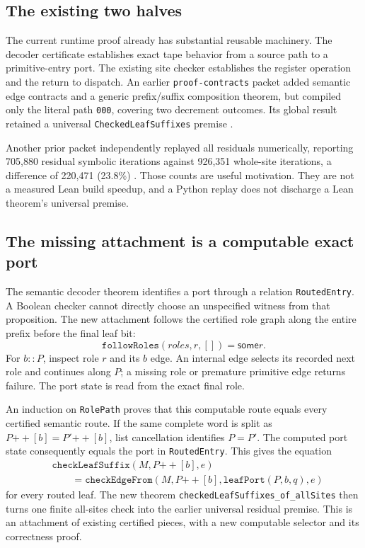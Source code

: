 \documentclass[11pt,letterpaper]{article}
\newcommand{\code}[1]{\texttt{#1}}
\newcommand{\Some}{\mathsf{some}}
\begin{document}
\subsection{The existing two halves}

The current runtime proof already has substantial reusable machinery. The decoder
certificate establishes exact tape behavior from a source path to a primitive-entry
port. The existing site checker establishes the register operation and the return to
dispatch. An earlier \code{proof-contracts} packet added semantic edge contracts and
a generic prefix/suffix composition theorem, but compiled only the literal path
\code{000}, covering two decrement outcomes. Its global result retained a universal
\code{CheckedLeafSuffixes} premise \cite{contracts}.

Another prior packet independently replayed all residuals numerically, reporting
705,880 residual symbolic iterations against 926,351 whole-site iterations, a
difference of 220,471 (23.8\%) \cite{sharing}. Those counts are useful motivation.
They are not a measured Lean build speedup, and a Python replay does not discharge
a Lean theorem's universal premise.

\subsection{The missing attachment is a computable exact port}

The semantic decoder theorem identifies a port through a relation
\code{RoutedEntry}. A Boolean checker cannot directly choose an unspecified witness
from that proposition. The new attachment follows the certified role graph along
the entire prefix before the final leaf bit:
\[
 \code{followRoles}(\mathit{roles},r,[]) = \Some r.
\]
For $b::P$, inspect role $r$ and its $b$ edge. An internal edge selects its recorded
next role and continues along $P$; a missing role or premature primitive edge
returns failure. The port state is read from the exact final role.

An induction on \code{RolePath} proves that this computable route equals every
certified semantic route. If the same complete word is split as
$P\mathbin{+\!+}[b]=P'\mathbin{+\!+}[b]$, list cancellation identifies $P=P'$.
The computed port state consequently equals the port in \code{RoutedEntry}.
This gives the equation
\[
\begin{split}
 &\code{checkLeafSuffix}(M,P\mathbin{+\!+}[b],e)\\
 &\qquad=\code{checkEdgeFrom}(M,P\mathbin{+\!+}[b],
                   \code{leafPort}(P,b,q),e)
\end{split}
\]
for every routed leaf. The new theorem
\code{checkedLeafSuffixes\_of\_allSites} then turns one finite all-sites check into
the earlier universal residual premise. This is an attachment of existing certified
pieces, with a new computable selector and its correctness proof.
\end{document}
